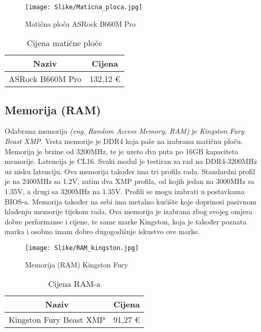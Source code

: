 \documentclass{article}
\begin{document}
     \begin{figure}[H]
        \centering
        \texttt{[image: Slike/Maticna\_ploca.jpg]}
        \caption{Matična ploča ASRock B660M Pro}
        \label{fig:Maticna}
    \end{figure}

    \begin{table}[H]
        \centering
        \begin{tabular}{|c|c|}
            \hline
            Naziv & Cijena \\
            \hline
            ASRock B660M Pro & 132,12 € \\
            \hline
        \end{tabular}
        \caption{Cijena matične ploče}
        \label{tab:Maticna}
    \end{table}

    \clearpage
    \subsection{Memorija (RAM)}
    Odabrana memorija \emph{(eng. Random Access Memory, RAM)} je \textit{Kingston Fury Beast XMP}. Vrsta memorije je DDR4 koja paše na izabranu matičnu ploču. Memorija je brzine od 3200MHz, te je uzeto dva puta po 16GB kapaciteta memorije. Latencija je CL16. Svaki modul je testiran za rad na DDR4-3200MHz uz nisku latenciju. Ova memorija također ima tri profila rada. Standardni profil je na 2400MHz sa 1.2V, zatim dva XMP profila, od kojih jedan na 3000MHz sa 1.35V, a drugi sa 3200MHz na 1.35V. Profili se mogu izabrati u postavkama BIOS-a. Memorija također na sebi ima metalno kućište koje doprinosi pasivnom hlađenju memorije tijekom rada. Ova memorija je izabrana zbog svojeg omjera dobre performanse i cijene, te same marke Kingston, koja je također poznata marka i osobno imam dobro dugogodišnje iskustvo ove marke.

    \begin{figure}[H]
        \centering
        \texttt{[image: Slike/RAM\_kingston.jpg]}
        \caption{Memorija (RAM) Kingston Fury}
        \label{fig:Memorija}
    \end{figure}

    \begin{table}[H]
        \centering
        \begin{tabular}{|c|c|}
            \hline
            Naziv & Cijena \\
            \hline
            Kingston Fury Beast XMP & 91,27 € \\
            \hline
        \end{tabular}
        \caption{Cijena RAM-a}
        \label{tab:Memorija}
    \end{table}
\end{document}
